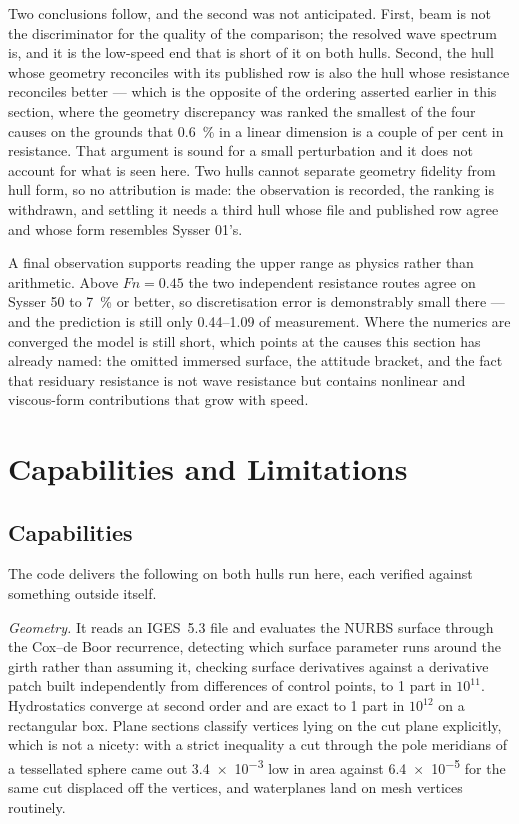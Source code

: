\documentclass[11pt]{article}
\newcommand{\Fn}{\mathit{Fn}}
\begin{document}
Two conclusions follow, and the second was not anticipated. First, beam is not the
discriminator for the quality of the comparison; the resolved wave spectrum is, and it is the
low-speed end that is short of it on both hulls. Second, the hull whose geometry reconciles
with its published row is also the hull whose resistance reconciles better --- which is the
opposite of the ordering asserted earlier in this section, where the geometry discrepancy was
ranked the smallest of the four causes on the grounds that \SI{0.6}{\percent} in a linear
dimension is a couple of per cent in resistance. That argument is sound for a small
perturbation and it does not account for what is seen here. Two hulls cannot separate
geometry fidelity from hull form, so no attribution is made: the observation is recorded, the
ranking is withdrawn, and settling it needs a third hull whose file and published row agree
and whose form resembles Sysser 01's.

A final observation supports reading the upper range as physics rather than arithmetic. Above
$\Fn = 0.45$ the two independent resistance routes agree on Sysser 50 to
\SI{7}{\percent} or better, so discretisation error is demonstrably small there --- and the prediction is
still only \numrange{0.44}{1.09} of measurement. Where the numerics are converged the model is still
short, which points at the causes this section has already named: the omitted immersed
surface, the attitude bracket, and the fact that residuary resistance is not wave resistance
but contains nonlinear and viscous-form contributions that grow with speed.

\section{Capabilities and Limitations}
\subsection{Capabilities}

The code delivers the following on both hulls run here, each verified against something
outside itself.

\textit{Geometry.} It reads an IGES~5.3 file and evaluates the NURBS surface through the
Cox--de Boor recurrence, detecting which surface parameter runs around the girth rather than
assuming it, checking surface derivatives against a derivative patch built
independently from differences of control points, to 1 part in $10^{11}$. Hydrostatics
converge at second order and are exact to 1 part in $10^{12}$ on a rectangular box.
Plane sections classify vertices lying on the cut plane explicitly, which is not a nicety:
with a strict inequality a cut through the pole meridians of a tessellated sphere came out
\num{3.4e-3} low in area against \num{6.4e-5} for the same cut displaced off the vertices,
and waterplanes land on mesh vertices routinely.
\end{document}
